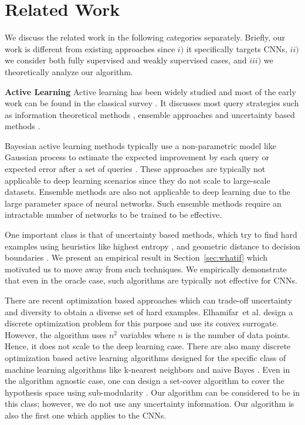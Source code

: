 \documentclass{article}
\begin{document}
\section{Related Work}
We discuss the related work in the following categories separately. Briefly, our work is different from existing approaches since $i)$ it specifically targets CNNs, $ii)$ we consider both fully supervised and weakly supervised cases, and $iii)$ we theoretically analyze our algorithm.

\noindent\textbf{Active Learning}
Active learning has been widely studied and most of the early work can be found in the classical survey \cite{settles2010active}. It discusses most query strategies such as information theoretical methods \cite{mackay1992information}, ensemble approaches \cite{mccallumzy1998employing, freund1997selective} and uncertainty based methods \cite{tong2001support,lewissequential,joshi2009multi,li2013adaptive}. %

Bayesian active learning methods typically use a non-parametric model like Gaussian process to estimate the expected improvement by each query \cite{kapoor2007active} or expected error after a set of queries \cite{roy2001toward}. These approaches are typically not applicable to deep learning scenarios since they do not scale to large-scale datasets. Ensemble methods are also not applicable to deep learning due to the large parameter space of neural networks. Such ensemble methods require an intractable number of networks to be trained to be effective.

One important class is that of uncertainty based methods, which try to find hard examples using heuristics like highest entropy \cite{joshi2009multi}, and geometric distance to decision boundaries \cite{tong2001support,brinker2003incorporating}. We present an empirical result in Section~\ref{sec:whatif} which motivated us to move away from such techniques. We empirically demonstrate that even in the oracle case, such algorithms are typically not effective for CNNs.

There are recent optimization based approaches which can trade-off uncertainty and diversity to obtain a diverse set of hard examples. Elhamifar~et al.  \cite{elhamifar2013convex} design a discrete optimization problem for this purpose and use its convex surrogate. However, the algorithm uses $n^2$ variables where $n$ is the number of data points. Hence, it does not scale to the deep learning case. There are also many discrete optimization based active learning algorithms designed for the specific class of machine learning algorithms like k-nearest neighbors and naive Bayes \cite{wei2015submodularity}. Even in the algorithm agnostic case, one can design a set-cover algorithm to cover the hypothesis space using sub-modularity \cite{guillory2010interactive, golovin2011adaptive}. Our algorithm can be considered to be in this class; however, we do not use any uncertainty information. Our algorithm is also the first one which applies to the CNNs.
\end{document}
